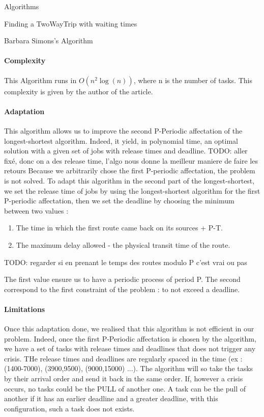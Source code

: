 \documentclass[a4paper,10pt]{report}
\newcommand{\todo}[1]{}
\renewcommand{\todo}[1]{{\color{red} TODO: {#1}}}
\begin{document}
\begin{chapter}{Algorithms}
\begin{section}{Finding a TwoWayTrip with waiting times}
\begin{subsection}{Barbara Simons's Algorithm}
\paragraph{Complexity}
This Algorithm runs in $O(n^2 \log(n))$, where n is the number of tasks. This complexity is given by the author of the article.

\paragraph{Adaptation}
This algorithm allows us to improve the second P-Periodic affectation of the longest-shortest algorithm. 
Indeed, it yield, in polynomial time, an optimal solution with a given set of jobs with release times and deadline. 
\todo{aller fixé, donc on a des release time, l'algo nous donne la meilleur maniere de faire les retours}
Because we arbitrarily chose the first P-periodic affectation, the problem is not solved.
To adapt this algorithm in the second part of the longest-shortest, we set the release time of jobs by using the longest-shortest algorithm for
the first P-periodic affectation, then we set the deadline by choosing the minimum between two values : 
\begin{enumerate}
 \item The time in which the first route came back on its sources + P-T.
 \item The maximum delay allowed - the physical transit time of the route.
\end{enumerate}
\todo{regarder si en prenant le temps des routes modulo P c'est vrai ou pas}

The first value ensure us to have a periodic process of period P. The second correspond to the first constraint of the problem : to not exceed a deadline.

\paragraph{Limitations}
Once this adaptation done, we realised that this algorithm is not efficient in our problem. Indeed, once the first P-Periodic affectation is chosen
by the algorithm, we have a set of tasks with release times and deadlines that does not trigger any crisis.
THe release times and deadlines are regularly spaced in the time (ex : (1400-7000), (3900,9500), (9000,15000) ...).
The algorithm will so take the tasks by their arrival order and send it back in the same order. If, however a crisis occurs, no tasks could be the PULL
of another one. A task can be the pull of another if it has an earlier deadline and a greater deadline, with this configuration, such a task does not exists.


\end{subsection}
\end{section}
\end{chapter}
\end{document}
